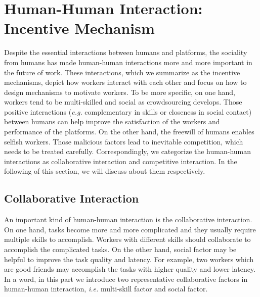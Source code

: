 \documentclass[11pt]{article}
\newcommand{\eg}{\textit{e.g.}\xspace}
\newcommand{\ie}{\textit{i.e.}\xspace}
\begin{document}
\section{Human-Human Interaction: Incentive Mechanism}
\label{sec:human-human}
Despite the essential interactions between humans and platforms, the sociality from humans has made human-human interactions more and more important in the future of work.
These interactions, which we summarize as the incentive mechanisms, depict how workers interact with each other and focus on how to design mechanisms to motivate workers.
To be more specific, on one hand, workers tend to be multi-skilled and social as crowdsourcing develops.
Those positive interactions (\eg complementary in skills or closeness in social contact) between humans can help improve the satisfaction of the workers and performance of the platforms.
On the other hand, the freewill of humans enables selfish workers.
Those malicious factors lead to inevitable competition, which needs to be treated carefully.
Correspondingly, we categorize the human-human interactions as collaborative interaction and competitive interaction.
In the following of this section, we will discuss about them respectively.

\subsection{Collaborative Interaction}
\label{subsec:hh-coll}
An important kind of human-human interaction is the collaborative interaction.
On one hand, tasks become more and more complicated and they usually require multiple skills to accomplish.
Workers with different skills should collaborate to accomplish the complicated tasks.
On the other hand, social factor may be helpful to improve the task quality and latency.
For example, two workers which are good friends may accomplish the tasks with higher quality and lower latency.
In a word, in this part we introduce two representative collaborative factors in human-human interaction, \ie multi-skill factor and social factor.
\end{document}
